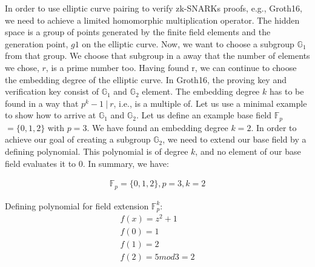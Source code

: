 In order to use elliptic curve pairing to verify zk-SNARKs proofs, e.g., Groth16, we need to achieve a limited homomorphic multiplication operator. The hidden space is a group of points generated by the finite field elements and the generation point, \(g1\) on the elliptic curve. Now, we want to choose a subgroup \begin{math} \mathbb{G}_1\end{math} from that group. We choose that subgroup in a away that the number of elements we chose, \(r\), is a prime number too. Having found r, we can continue to choose the embedding degree of the elliptic curve. In Groth16, the proving key and verification key consist of \begin{math} \mathbb{G}_1\end{math} and \begin{math} \mathbb{G}_2\end{math} element. The embedding degree \(k\) has to be found in a way that \(p^k-1\ |\ r\), i.e., is a multiple of. Let us use a minimal example to show how to arrive at \begin{math} \mathbb{G}_1\end{math} and \begin{math} \mathbb{G}_2\end{math}.
Let us define an example base field \begin{math}\mathbb{F}_p\end{math} \(= \{0,1,2\}\) with \(p = 3\). We have found an embedding degree \(k=2\). In order to achieve our goal of creating a subgroup \begin{math} \mathbb{G}_2\end{math}, we need to extend our base field by a defining polynomial. This polynomial is of degree \(k\), and no element of our base field evaluates it to 0. In summary, we have:

\begin{align}
    \mathbb{F}_p = \{0,1,2\}, p = 3, k = 2
\end{align}

Defining polynomial for field extension \begin{math}\mathbb{F}_p^k\end{math}: 
\begin{align*}
    f(x) = z^2 +1 \\
    f(0) = 1\\
    f(1) = 2\\
    f(2) = 5 mod 3 = 2
\end{align*}

